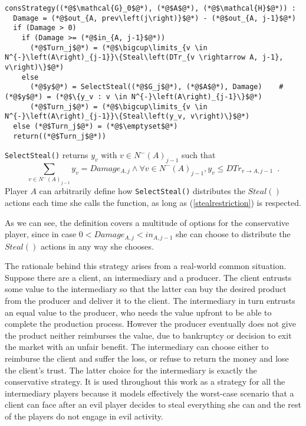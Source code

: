 \documentclass[11pt]{llncs}
\theoremstyle{definition}
\begin{document}
     \begin{lstlisting}[label=conservativestrategy, style=numbers]
consStrategy((*@$\mathcal{G}_0$@*), (*@$A$@*), (*@$\mathcal{H}$@*)) :
  Damage = (*@$out_{A, prev\left(j\right)}$@*) - (*@$out_{A, j-1}$@*)
  if (Damage > 0)
    if (Damage >= (*@$in_{A, j-1}$@*))
      (*@$Turn_j$@*) = (*@$\bigcup\limits_{v \in N^{-}\left(A\right)_{j-1}}\{Steal\left(DTr_{v \rightarrow A, j-1}, v\right)\}$@*)
    else
      (*@$y$@*) = SelectSteal((*@$G_j$@*), (*@$A$@*), Damage)    #(*@$y$@*) = (*@$\{y_v : v \in N^{-}\left(A\right)_{j-1}\}$@*)
      (*@$Turn_j$@*) = (*@$\bigcup\limits_{v \in N^{-}\left(A\right)_{j-1}}\{Steal\left(y_v, v\right)\}$@*)
  else (*@$Turn_j$@*) = (*@$\emptyset$@*)
  return((*@$Turn_j$@*))
     \end{lstlisting}
     \texttt{SelectSteal()} returns $y_v$ with $v \in N^{-}\left(A\right)_{j-1}$ such that
     \begin{equation}
     \label{stealrestriction}
        \sum\limits_{v \in N^{-}\left(A\right)_{j-1}}y_v = Damage_{A, j} \wedge \forall v \in N^{-}\left(A\right)_{j-1},
        y_v \leq DTr_{v \rightarrow A, j-1} \enspace.
     \end{equation}
     Player $A$ can arbitrarily define how \texttt{SelectSteal()} distributes the $Steal\left(\right)$ actions
     each time she calls the function, as long as (\ref{stealrestriction}) is respected. 

     As we can see, the definition covers a multitude of options for the conservative player, since in case $0 < Damage_{A,j}
     < in_{A,j-1}$ she can choose to distribute the $Steal\left(\right)$ actions in any way she chooses.

     The rationale behind this strategy arises from a real-world common situation. Suppose there are a client, an
     intermediary and a producer. The client entrusts some value to the intermediary so that the latter can buy the desired
     product from the producer and deliver it to the client. The intermediary in turn entrusts an equal value to the
     producer, who needs the value upfront to be able to complete the production process. However the producer eventually
     does not give the product neither reimburses the value, due to bankruptcy or decision to exit the market with an unfair
     benefit. The intermediary can choose either to reimburse the client and suffer the loss, or refuse to return the money
     and lose the client's trust. The latter choice for the intermediary is exactly the conservative strategy. It is used
     throughout this work as a strategy for all the intermediary players because it models effectively the worst-case
     scenario that a client can face after an evil player decides to steal everything she can and the rest of the players do
     not engage in evil activity.
\end{document}
